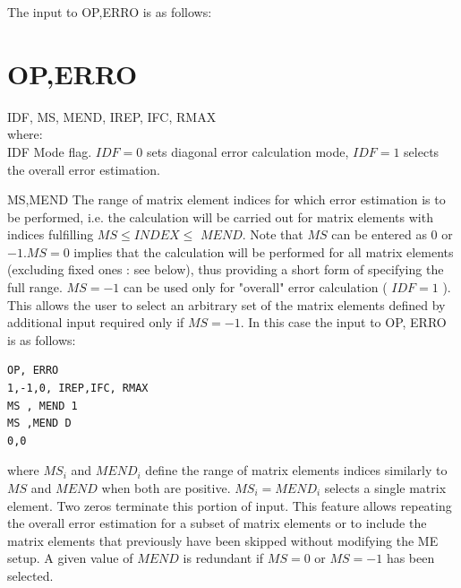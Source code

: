 \documentclass[10pt]{article}
\begin{document}
The input to OP,ERRO is as follows:

\section*{OP,ERRO}
IDF, MS, MEND, IREP, IFC, RMAX\\
where:\\
IDF Mode flag. $I D F=0$ sets diagonal error calculation mode, $I D F=1$ selects the overall error estimation.

MS,MEND The range of matrix element indices for which error estimation is to be performed, i.e. the calculation will be carried out for matrix elements with indices fulfilling $M S \leq I N D E X \leq$ $M E N D$. Note that $M S$ can be entered as 0 or $-1 . M S=0$ implies that the calculation will be performed for all matrix elements (excluding fixed ones : see below), thus providing a short form of specifying the full range. $M S=-1$ can be used only for "overall" error calculation ( $I D F=1$ ). This allows the user to select an arbitrary set of the matrix elements defined by additional input required only if $M S=-1$. In this case the input to OP, ERRO is as follows:

\begin{verbatim}
OP, ERRO
1,-1,0, IREP,IFC, RMAX
MS , MEND 1
MS ,MEND D
0,0
\end{verbatim}

where $M S_{i}$ and $M E N D_{i}$ define the range of matrix elements indices similarly to $M S$ and $M E N D$ when both are positive. $M S_{i}=M E N D_{i}$ selects a single matrix element. Two zeros terminate this portion of input. This feature allows repeating the overall error estimation for a subset of matrix elements or to include the matrix elements that previously have been skipped without modifying the ME setup. A given value of $M E N D$ is redundant if $M S=0$ or $M S=-1$ has been selected.
\end{document}
